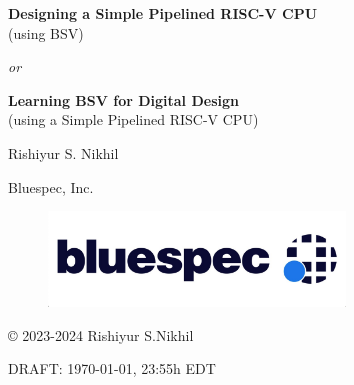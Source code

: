 
\pagestyle{empty}

\begin{center}

\vspace*{1.5in}

{\LARGE\bf Designing a Simple Pipelined RISC-V CPU} \\
{\Large (using BSV)}

\emph{or}

{\LARGE\bf Learning BSV for Digital Design} \\
{\Large (using a Simple Pipelined RISC-V CPU)}

\vspace{2cm}

{\Large Rishiyur S. Nikhil}

Bluespec, Inc.

\vspace*{0.5in}

\begin{figure}[htbp]
  \centerline{\includegraphics[height=1in,angle=0]{ch000_front/Bluespec_Logo_2022-10}}
\end{figure}

\vspace*{0.5in}

\copyright{} 2023-2024 Rishiyur S.Nikhil

\vspace{1in}

{\small DRAFT: \today, 23:55h EDT}

\end{center}


% 



\vspace*{2in}


% 


\newpage

\pagestyle{myheadings}


{\small

\tableofcontents

}




